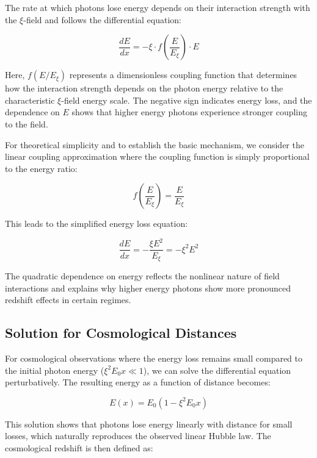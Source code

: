 \documentclass[12pt,a4paper]{article}
\begin{document}
	The rate at which photons lose energy depends on their interaction strength with the $\xi$-field and follows the differential equation:
	
	\begin{equation}
		\frac{dE}{dx} = -\xi \cdot f\left(\frac{E}{E_\xi}\right) \cdot E
	\end{equation}
	
	Here, $f(E/E_\xi)$ represents a dimensionless coupling function that determines how the interaction strength depends on the photon energy relative to the characteristic $\xi$-field energy scale. The negative sign indicates energy loss, and the dependence on $E$ shows that higher energy photons experience stronger coupling to the field.
	
	For theoretical simplicity and to establish the basic mechanism, we consider the linear coupling approximation where the coupling function is simply proportional to the energy ratio:
	
	\begin{equation}
		f\left(\frac{E}{E_\xi}\right) = \frac{E}{E_\xi}
	\end{equation}
	
	This leads to the simplified energy loss equation:
	
	\begin{equation}
		\frac{dE}{dx} = -\frac{\xi E^2}{E_\xi} = -\xi^2 E^2
	\end{equation}
	
	The quadratic dependence on energy reflects the nonlinear nature of field interactions and explains why higher energy photons show more pronounced redshift effects in certain regimes.
	
	\subsection{Solution for Cosmological Distances}
	
	For cosmological observations where the energy loss remains small compared to the initial photon energy ($\xi^2 E_0 x \ll 1$), we can solve the differential equation perturbatively. The resulting energy as a function of distance becomes:
	
	\begin{equation}
		E(x) = E_0 \left(1 - \xi^2 E_0 x\right)
	\end{equation}
	
	This solution shows that photons lose energy linearly with distance for small losses, which naturally reproduces the observed linear Hubble law. The cosmological redshift is then defined as:
	
\end{document}

